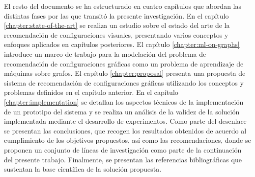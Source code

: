 El resto del documento se ha estructurado
en cuatro cap\'itulos que abordan las distintas fases
por las que transit\'o la presente investigaci\'on. En el cap\'itulo \ref{chapter:state-of-the-art} 
se realiza un estudio sobre el estado del arte de la recomendaci\'on
de configuraciones visuales, presentando varios conceptos y enfoques
aplicados en cap\'itulos posteriores. El cap\'itulo \ref{chapter:ml-on-graphs}
introduce un marco de trabajo para la modelaci\'on del problema de recomendaci\'on
de configuraciones gr\'aficas como un problema de aprendizaje de m\'aquinas sobre grafos.
El cap\'itulo \ref{chapter:proposal} presenta una propuesta de sistema de recomendaci\'on
de configuraciones gr\'aficas utilizando los conceptos y problemas definidos en el cap\'itulo anterior.
En el cap\'itulo \ref{chapter:implementation} se detallan los
aspectos t\'ecnicos de la implementaci\'on de un prototipo del sistema y
se realiza un an\'alisis de la validez de la soluci\'on implementada
mediante el desarrollo de experimentos. Como parte del desenlace
se presentan las conclusiones, que recogen los resultados
obtenidos de acuerdo al cumplimiento de los objetivos propuestos, as\'i como 
las recomendaciones, donde se proponen un conjunto de l\'ineas
de investigaci\'on como parte de la continuaci\'on del presente trabajo.
Finalmente, se presentan las referencias bibliogr\'aficas que sustentan
la base cient\'ifica de la soluci\'on propuesta.





